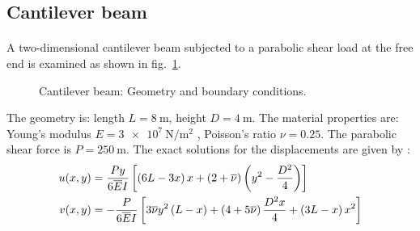 \subsection{Cantilever beam}
\paragraph{}
A two-dimensional cantilever beam subjected to a parabolic shear load at the free end is examined as shown
in fig.~\ref{iso_fig:cantilever_beam_geo_bc}.
    \begin{figure}[h!]
    \centering
        \caption{ Cantilever beam: Geometry and boundary conditions.}
        \label{iso_fig:cantilever_beam_geo_bc}
    \end{figure}

The geometry is: length $ L = \SI{8}{\meter} $, height $ D = \SI{4}{\meter} $.
The material properties are: Young’s modulus $ E = \SI{3e7}{\newton \per \square \meter}$ , Poisson’s ratio $ \nu = 0.25 $.
The parabolic shear force is $P = \SI{250}{\meter} $.
The exact solutions for the displacements are given by \cite{Aug2008}:
    \begin{equation}
        \begin{aligned}
            u(x,y) &= 
                \frac{Py}{6 \overline{E} I}
                \left[
                    \left(
                        6L-3x
                    \right)x
                    +\left(
                        2+ \overline{\nu}
                    \right)\left(
                        y^2-\frac{D^2}{4}
                    \right)
                \right]
            \\
            v(x,y) &=  
                -\frac{P}{6 \overline{E} I}
                \left[
                    3 \overline{\nu} y^2 \left(
                        L-x
                    \right)+
                    \left(
                        4+5 \overline{\nu}
                    \right)\frac{D^2x}{4}+
                    \left(
                        3L-x
                    \right)x^2
                \right]        
        \end{aligned}
    \label{iso_eq:cantilever_beam_displacement_solution}
    \end{equation}

